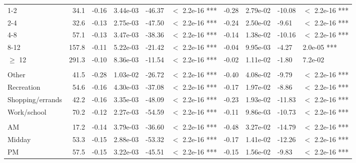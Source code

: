 \documentclass{article}\usepackage[utf8]{inputenc}
\begin{document}
\begin{table}[H]
\begin{tabular}{lrllllllll}
\hspace{1em}1-2 & 34.1 & -0.16 & 3.44e-03 & -46.37 & $<$ 2.2e-16 *** & -0.28 & 2.79e-02 & -10.08 & $<$ 2.2e-16 ***\\
\hspace{1em}2-4 & 32.6 & -0.13 & 2.75e-03 & -47.50 & $<$ 2.2e-16 *** & -0.24 & 2.50e-02 & -9.61 & $<$ 2.2e-16 ***\\
\hspace{1em}4-8 & 57.1 & -0.13 & 3.47e-03 & -38.36 & $<$ 2.2e-16 *** & -0.14 & 1.38e-02 & -10.16 & $<$ 2.2e-16 ***\\
\hspace{1em}8-12 & 157.8 & -0.11 & 5.22e-03 & -21.42 & $<$ 2.2e-16 *** & -0.04 & 9.95e-03 & -4.27 & 2.0e-05 ***\\
\hspace{1em}$\geq$ 12 & 291.3 & -0.10 & 8.36e-03 & -11.54 & $<$ 2.2e-16 *** & -0.02 & 1.11e-02 & -1.80 & 7.2e-02\\
\addlinespace[0.3em]
\multicolumn{10}{l}{\textbf{Trip purpose model, $McFadden~R^2 = 0.55$}}\\
\hline
\hspace{1em}Other & 41.5 & -0.28 & 1.03e-02 & -26.72 & $<$ 2.2e-16 *** & -0.40 & 4.08e-02 & -9.79 & $<$ 2.2e-16 ***\\
\hspace{1em}Recreation & 54.6 & -0.16 & 4.30e-03 & -37.08 & $<$ 2.2e-16 *** & -0.17 & 1.97e-02 & -8.86 & $<$ 2.2e-16 ***\\
\hspace{1em}Shopping/errands & 42.2 & -0.16 & 3.35e-03 & -48.09 & $<$ 2.2e-16 *** & -0.23 & 1.93e-02 & -11.83 & $<$ 2.2e-16 ***\\
\hspace{1em}Work/school & 70.2 & -0.12 & 2.27e-03 & -54.59 & $<$ 2.2e-16 *** & -0.11 & 9.86e-03 & -10.73 & $<$ 2.2e-16 ***\\
\addlinespace[0.3em]
\multicolumn{10}{l}{\textbf{Time-of-day model, $McFadden~R^2 = 0.53$}}\\
\hline
\hspace{1em}AM & 17.2 & -0.14 & 3.79e-03 & -36.60 & $<$ 2.2e-16 *** & -0.48 & 3.27e-02 & -14.79 & $<$ 2.2e-16 ***\\
\hspace{1em}Midday & 53.3 & -0.15 & 2.88e-03 & -53.32 & $<$ 2.2e-16 *** & -0.17 & 1.41e-02 & -12.26 & $<$ 2.2e-16 ***\\
\hspace{1em}PM & 57.5 & -0.15 & 3.22e-03 & -45.51 & $<$ 2.2e-16 *** & -0.15 & 1.56e-02 & -9.83 & $<$ 2.2e-16 ***\\

\end{tabular}
\end{table}
\end{document}
